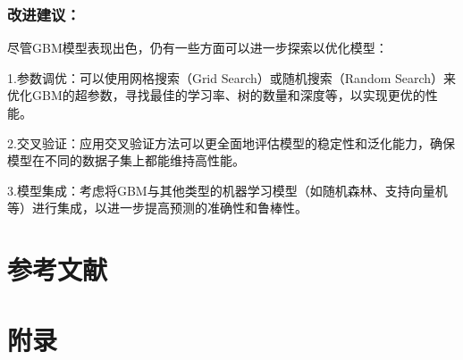 \documentclass[AutoFakeBold]{ctexart}
\begin{document}
	 \subsubsection{改进建议：}
	
	尽管GBM模型表现出色，仍有一些方面可以进一步探索以优化模型：
	
	1.参数调优：可以使用网格搜索（Grid Search）或随机搜索（Random Search）来优化GBM的超参数，寻找最佳的学习率、树的数量和深度等，以实现更优的性能。\cite{jain2016complete}
	
	2.交叉验证：应用交叉验证方法可以更全面地评估模型的稳定性和泛化能力，确保模型在不同的数据子集上都能维持高性能。\cite{xue2011极限学习机的快速留一交叉验证算法}
	
	3.模型集成：考虑将GBM与其他类型的机器学习模型（如随机森林、支持向量机等）进行集成，以进一步提高预测的准确性和鲁棒性。
	
	
	
	\section{参考文献}
	
	
	\newpage
	\section{附录}
\end{document}
